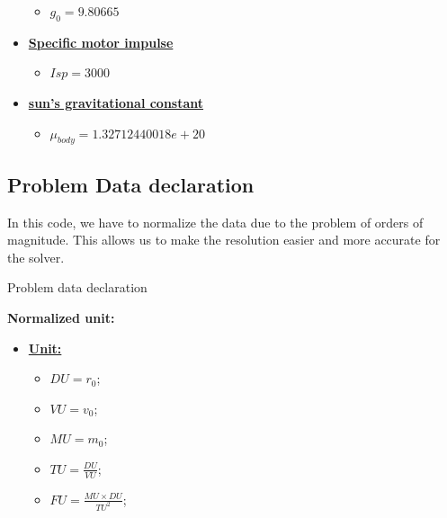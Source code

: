 \documentclass{article}
\begin{document}
\begin{algorithm}[H]
\begin{algorithmic}
\begin{itemize}[]
				\begin{itemize}
					\item $g_0 = 9.80665$
				\end{itemize}
				\item \textbf{\underline{Specific motor impulse}}
				\begin{itemize}
					\item $Isp = 3000$
				\end{itemize}
				\item \textbf{\underline{sun's gravitational constant}}
				\begin{itemize}
					\item $\mu_{body} = 1.32712440018e+20$
				\end{itemize}
			\end{itemize}
		\end{algorithmic}
	\end{algorithm}
	
	
	\subsection{Problem Data declaration}
	
	In this code, we have to normalize the data due to the problem of orders of magnitude. This allows us to make the resolution easier and more accurate for the solver.
	
	\begin{algorithm}[H]
		\caption{Problem data declaration}\label{alg:satellite_maneuvering}
		\begin{algorithmic}
			
			\State \textbf{Normalized unit:} \\
			\begin{itemize}[]
				\item \textbf{\underline{Unit:}}
				\begin{itemize}
					\item $DU = r_0$; %
					\item $VU = v_0$; %
					\item $MU = m_0$; %
					\item $TU = \frac{DU}{VU}$; %
					\item $FU = \frac{MU \times DU}{TU^2}$; %
				\end{itemize}
			\end{itemize}
		\end{algorithmic}
	\end{algorithm}
	
\end{document}
